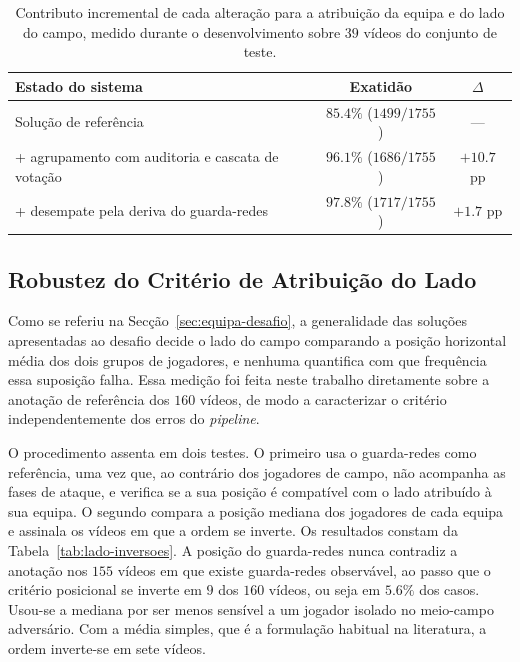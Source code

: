 \begin{table}[htbp]
    \centering
    \caption{Contributo incremental de cada alteração para a atribuição da equipa e do lado do campo, medido durante o desenvolvimento sobre $39$ vídeos do conjunto de teste.}
    \label{tab:team-resultados}
    \begin{tabular}{|l|c|c|}
        \hline
        \textbf{Estado do sistema} & \textbf{Exatidão} & \textbf{$\Delta$} \\
        \hline
        Solução de referência                              & $85.4\%$ ($1499/1755$) & --- \\
        \hline
        + agrupamento com auditoria e cascata de votação   & $96.1\%$ ($1686/1755$) & $+10.7$ pp \\
        \hline
        + desempate pela deriva do guarda-redes            & $97.8\%$ ($1717/1755$) & $+1.7$ pp \\
        \hline
    \end{tabular}
\end{table}

\subsection{Robustez do Critério de Atribuição do Lado}\label{sec:res_lado_quantificacao}

Como se referiu na Secção~\ref{sec:equipa-desafio}, a generalidade das soluções apresentadas ao desafio decide o lado do campo comparando a posição horizontal média dos dois grupos de jogadores, e nenhuma quantifica com que frequência essa suposição falha. Essa medição foi feita neste trabalho diretamente sobre a anotação de referência dos $160$ vídeos, de modo a caracterizar o critério independentemente dos erros do \emph{pipeline}.

O procedimento assenta em dois testes. O primeiro usa o guarda-redes como referência, uma vez que, ao contrário dos jogadores de campo, não acompanha as fases de ataque, e verifica se a sua posição é compatível com o lado atribuído à sua equipa. O segundo compara a posição mediana dos jogadores de cada equipa e assinala os vídeos em que a ordem se inverte. Os resultados constam da Tabela~\ref{tab:lado-inversoes}. A posição do guarda-redes nunca contradiz a anotação nos $155$ vídeos em que existe guarda-redes observável, ao passo que o critério posicional se inverte em $9$ dos $160$ vídeos, ou seja em $5.6\%$ dos casos. Usou-se a mediana por ser menos sensível a um jogador isolado no meio-campo adversário. Com a média simples, que é a formulação habitual na literatura, a ordem inverte-se em sete vídeos.


